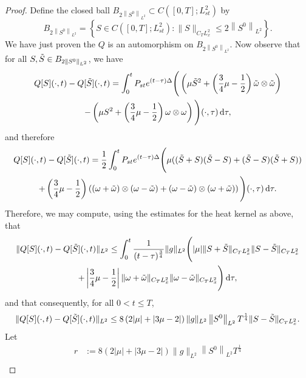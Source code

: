 \documentclass[11pt]{article}
\theoremstyle{plain}
\theoremstyle{remark}
\numberwithin{equation}{section}
\newcommand{\diff}{\mathop{}\!\mathrm{d}}
\begin{document}
\begin{proof}
Define the closed ball $B_{2\left\|S^0\right\|_{L^2}}\subset 
C\left([0,T];L^2_{st}\right)$ by
\begin{equation}
    B_{2\left\|S^0\right\|_{L^2}}
    =\left\{
    S\in C\left([0,T];L^2_{st}\right):
    \|S\|_{C_T L^2_x}\leq 
    2\left\|S^0\right\|_{L^2}
    \right\}.
\end{equation}
We have just proven the $Q$ is an automorphism on $B_{2\left\|S^0\right\|_{L^2}}$.
Now observe that for all 
$S,\Tilde{S}\in
B_{2\left\|S^0\right\|_{L^2}}$,
we have
\begin{multline}
    Q[S](\cdot,t)-Q[\Tilde{S}](\cdot,t)
    =
    \int_0^t P_{st} e^{(t-\tau)\Delta}
    \Bigg(\left(\mu \Tilde{S}^2+ 
\left(\frac{3}{4}\mu-\frac{1}{2}\right)
\Tilde{\omega}\otimes\Tilde{\omega} \right) \\
-\left(\mu S^2+ 
\left(\frac{3}{4}\mu-\frac{1}{2}\right)
\omega\otimes\omega \right)\Bigg)(\cdot,\tau)
\diff\tau,
\end{multline}
and therefore
\begin{multline}
Q[S](\cdot,t)-Q[\Tilde{S}](\cdot,t)
=
\frac{1}{2}
\int_0^t P_{st} e^{(t-\tau)\Delta}
    \Bigg(\mu ((\Tilde{S}+S)(\Tilde{S}-S)
    +(\Tilde{S}-S)(\Tilde{S}+S)) \\
+\left(\frac{3}{4}\mu-\frac{1}{2}\right)
\left((\omega+\Tilde{\omega})\otimes 
(\omega-\Tilde{\omega})
+(\omega-\Tilde{\omega})\otimes 
(\omega+\Tilde{\omega})
\right)\Bigg)(\cdot,\tau)
\diff\tau.
\end{multline}
Therefore, we may compute, using the estimates for the heat kernel as above, that
\begin{multline}
\|Q[S](\cdot,t)-Q[\Tilde{S}](\cdot,t)\|_{L^2}
\leq 
\int_0^t
\frac{1}{(t-\tau)^\frac{3}{4}}
\|g\|_{L^2}
\Bigg(|\mu|\|S+\Tilde{S}\|_{C_T L^2_x}
\|S-\Tilde{S}\|_{C_T L^2_x} \\
+\left|\frac{3}{4}\mu-\frac{1}{2}\right|
\|\omega+\Tilde{\omega}\|_{C_T L^2_x}
\|\omega-\Tilde{\omega}\|_{C_T L^2_x}
\Bigg) \diff \tau,
\end{multline}
and that consequently,
for all $0<t \leq T$,
\begin{equation}
    \|Q[S](\cdot,t)-Q[\Tilde{S}](\cdot,t)\|_{L^2}
    \leq 
    8\left(2|\mu|
    +\left|3\mu-2\right|\right)
    \|g\|_{L^2}
    \left\|S^0\right\|_{L^2}
    T^\frac{1}{4}
    \|S-\Tilde{S}\|_{C_T L^2_x}.
\end{equation}
Let 
\begin{align}
    r&:= 
    8\left(2|\mu|
    +\left|3\mu-2\right|\right)
    \|g\|_{L^2}
    \left\|S^0\right\|_{L^2}
    T^\frac{1}{4} \\

\end{align}
\end{proof}
\end{document}
